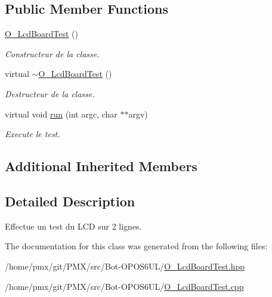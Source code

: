 \subsection*{Public Member Functions}
\begin{DoxyCompactItemize}
\item 
\mbox{\label{classO__LcdBoardTest_a959c4386e6f80808230e3fe6b8f426d7}} 
\hyperlink{classO__LcdBoardTest_a959c4386e6f80808230e3fe6b8f426d7}{O\+\_\+\+Lcd\+Board\+Test} ()
\begin{DoxyCompactList}\small\item\em Constructeur de la classe. \end{DoxyCompactList}\item 
\mbox{\label{classO__LcdBoardTest_a259ea859e0bbcb81285b97ab448a0453}} 
virtual \hyperlink{classO__LcdBoardTest_a259ea859e0bbcb81285b97ab448a0453}{$\sim$\+O\+\_\+\+Lcd\+Board\+Test} ()
\begin{DoxyCompactList}\small\item\em Destructeur de la classe. \end{DoxyCompactList}\item 
\mbox{\label{classO__LcdBoardTest_a5fe507797dd1ee404d3fd4a0fd6b7885}} 
virtual void \hyperlink{classO__LcdBoardTest_a5fe507797dd1ee404d3fd4a0fd6b7885}{run} (int argc, char $\ast$$\ast$argv)
\begin{DoxyCompactList}\small\item\em Execute le test. \end{DoxyCompactList}\end{DoxyCompactItemize}
\subsection*{Additional Inherited Members}


\subsection{Detailed Description}
Effectue un test du L\+CD sur 2 lignes. 

The documentation for this class was generated from the following files\+:\begin{DoxyCompactItemize}
\item 
/home/pmx/git/\+P\+M\+X/src/\+Bot-\/\+O\+P\+O\+S6\+U\+L/\hyperlink{O__LcdBoardTest_8hpp}{O\+\_\+\+Lcd\+Board\+Test.\+hpp}\item 
/home/pmx/git/\+P\+M\+X/src/\+Bot-\/\+O\+P\+O\+S6\+U\+L/\hyperlink{O__LcdBoardTest_8cpp}{O\+\_\+\+Lcd\+Board\+Test.\+cpp}\end{DoxyCompactItemize}
